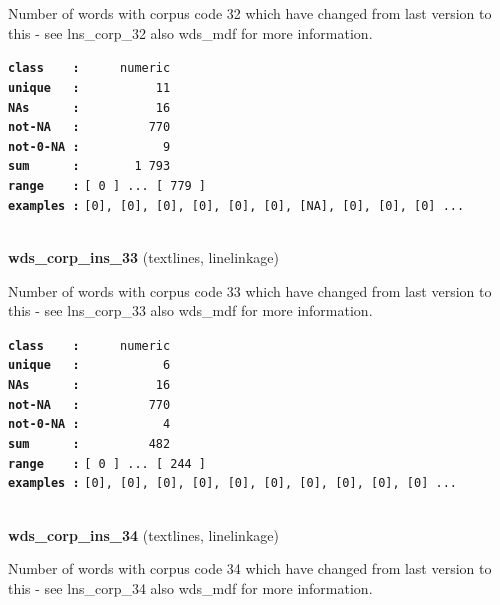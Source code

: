 \documentclass[]{article}
\begin{document}
Number of words with corpus code 32 which have changed from last version
to this - see lns\_corp\_32 also wds\_mdf for more information.

\textbf{\texttt{class\ \ \ \ :}} \texttt{~~~~~numeric}\\
\textbf{\texttt{unique\ \ \ :}} \texttt{~~~~~~~~~~11}\\
\textbf{\texttt{NAs\ \ \ \ \ \ :}} \texttt{~~~~~~~~~~16}\\
\textbf{\texttt{not-NA\ \ \ :}} \texttt{~~~~~~~~~770}\\
\textbf{\texttt{not-0-NA\ :}} \texttt{~~~~~~~~~~~9}\\
\textbf{\texttt{sum\ \ \ \ \ \ :}} \texttt{~~~~~~~1~793}\\
\textbf{\texttt{range\ \ \ \ :}}
\texttt{{[}\ 0\ {]}\ ...\ {[}\ 779\ {]}}\\
\textbf{\texttt{examples\ :}}
\texttt{{[}0{]},\ {[}0{]},\ {[}0{]},\ {[}0{]},\ {[}0{]},\ {[}0{]},\ {[}NA{]},\ {[}0{]},\ {[}0{]},\ {[}0{]}\ ...}\\

~

\textbf{wds\_corp\_ins\_33} (textlines, linelinkage)

Number of words with corpus code 33 which have changed from last version
to this - see lns\_corp\_33 also wds\_mdf for more information.

\textbf{\texttt{class\ \ \ \ :}} \texttt{~~~~~numeric}\\
\textbf{\texttt{unique\ \ \ :}} \texttt{~~~~~~~~~~~6}\\
\textbf{\texttt{NAs\ \ \ \ \ \ :}} \texttt{~~~~~~~~~~16}\\
\textbf{\texttt{not-NA\ \ \ :}} \texttt{~~~~~~~~~770}\\
\textbf{\texttt{not-0-NA\ :}} \texttt{~~~~~~~~~~~4}\\
\textbf{\texttt{sum\ \ \ \ \ \ :}} \texttt{~~~~~~~~~482}\\
\textbf{\texttt{range\ \ \ \ :}}
\texttt{{[}\ 0\ {]}\ ...\ {[}\ 244\ {]}}\\
\textbf{\texttt{examples\ :}}
\texttt{{[}0{]},\ {[}0{]},\ {[}0{]},\ {[}0{]},\ {[}0{]},\ {[}0{]},\ {[}0{]},\ {[}0{]},\ {[}0{]},\ {[}0{]}\ ...}\\

~

\textbf{wds\_corp\_ins\_34} (textlines, linelinkage)

Number of words with corpus code 34 which have changed from last version
to this - see lns\_corp\_34 also wds\_mdf for more information.
\end{document}
